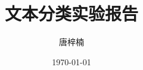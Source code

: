 \documentclass[12pt]{ctexart}
\begin{document}


\newpage

\tableofcontents
\newpage

\title{文本分类实验报告}
\author{唐梓楠}
\date{\today}

\newpage
\printbibliography
\end{document}
